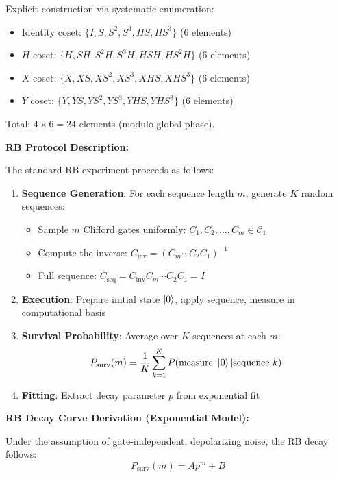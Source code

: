 \documentclass[11pt,a4paper]{article}
\theoremstyle{definition}
\theoremstyle{remark}
\begin{document}
Explicit construction via systematic enumeration:
\begin{itemize}
    \item Identity coset: $\{I, S, S^2, S^3, HS, HS^3\}$ (6 elements)
    \item $H$ coset: $\{H, SH, S^2H, S^3H, HSH, HS^2H\}$ (6 elements)
    \item $X$ coset: $\{X, XS, XS^2, XS^3, XHS, XHS^3\}$ (6 elements)
    \item $Y$ coset: $\{Y, YS, YS^2, YS^3, YHS, YHS^3\}$ (6 elements)
\end{itemize}

Total: $4 \times 6 = 24$ elements (modulo global phase).

\textbf{RB Protocol Description:}

The standard RB experiment proceeds as follows:

\begin{enumerate}
    \item \textbf{Sequence Generation}: For each sequence length $m$, generate $K$ random sequences:
    \begin{itemize}
        \item Sample $m$ Clifford gates uniformly: $C_1, C_2, \ldots, C_m \in \mathcal{C}_1$
        \item Compute the inverse: $C_{\text{inv}} = (C_m \cdots C_2 C_1)^{-1}$
        \item Full sequence: $C_{\text{seq}} = C_{\text{inv}} C_m \cdots C_2 C_1 = I$
    \end{itemize}

    \item \textbf{Execution}: Prepare initial state $\ket{0}$, apply sequence, measure in computational basis

    \item \textbf{Survival Probability}: Average over $K$ sequences at each $m$:
    \begin{equation}
    P_{\text{surv}}(m) = \frac{1}{K}\sum_{k=1}^K P(\text{measure } \ket{0} | \text{sequence } k)
    \end{equation}

    \item \textbf{Fitting}: Extract decay parameter $p$ from exponential fit
\end{enumerate}

\textbf{RB Decay Curve Derivation (Exponential Model):}

Under the assumption of gate-independent, depolarizing noise, the RB decay follows:
\begin{equation}
P_{\text{surv}}(m) = A p^m + B
\end{equation}
\end{document}
